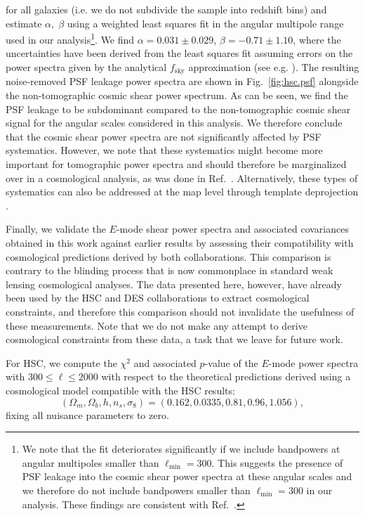\documentclass[a4paper,11pt]{article}
\newcommand{\cospar}{(\Omega_m, \allowbreak \Omega_b, \allowbreak h, \allowbreak n_s,\allowbreak \sigma_8)}
\begin{document}
      for all galaxies (i.e. we do not subdivide the sample into redshift bins) and estimate $\alpha, \; \beta$ using a weighted least squares fit in the angular multipole range used in our analysis\footnote{We note that the fit deteriorates significantly if we include bandpowers at angular multipoles smaller than $\ell_{\mathrm{min}} = 300$. This suggests the presence of PSF leakage into the cosmic shear power spectra at these angular scales and we therefore do not include bandpowers smaller than $\ell_{\mathrm{min}} = 300$ in our analysis. These findings are consistent with Ref.~\cite{1809.09148}.}. We find $\alpha = 0.031 \pm 0.029$, $\beta = -0.71 \pm 1.10$, where the uncertainties have been derived from the least squares fit assuming errors on the power spectra given by the analytical $f_{\mathrm{sky}}$ approximation (see e.g. \cite{9305030}). The resulting noise-removed PSF leakage power spectra are shown in Fig.~\ref{fig:hsc.psf} alongside the non-tomographic cosmic shear power spectrum. As can be seen, we find the PSF leakage to be subdominant compared to the non-tomographic cosmic shear signal for the angular scales considered in this analysis. We therefore conclude that the cosmic shear power spectra are not significantly affected by PSF systematics. However, we note that these systematics might become more important for tomographic  power spectra and should therefore be marginalized over in a cosmological analysis, as was done in Ref.~\cite{1809.09148}. Alternatively, these types of systematics can also be addressed at the map level through template deprojection \citep{1809.09603}.
     
      Finally, we validate the $E$-mode shear power spectra and associated covariances obtained in this work against earlier results by assessing their compatibility with cosmological predictions derived by both collaborations. This comparison is contrary to the blinding process that is now commonplace in standard weak lensing cosmological analyses. The data presented here, however, have already been used by the HSC and DES collaborations to extract cosmological constraints, and therefore this comparison should not invalidate the usefulness of these measurements. Note that we do not make any attempt to derive cosmological constraints from these data, a task that we leave for future work.
        
      For HSC, we compute the $\chi^2$ and associated $p$-value of the $E$-mode power spectra with $300 \leq \ell \leq 2000$ with respect to the theoretical predictions derived using a cosmological model compatible with the HSC results:
      \begin{equation}\label{eq:hsccosmo}
        \cospar{} = (0.162,\allowbreak 0.0335,\allowbreak 0.81,\allowbreak 0.96,\allowbreak 1.056),
      \end{equation}
      fixing all nuisance parameters to zero. 
\end{document}
